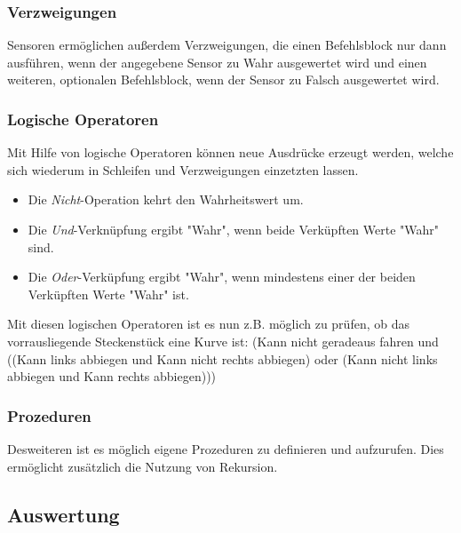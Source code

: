 \subsubsection{Verzweigungen}
\label{sec:implementation:program:elements:if-else}

Sensoren ermöglichen außerdem Verzweigungen, die einen Befehlsblock nur dann ausführen, wenn der angegebene Sensor zu Wahr ausgewertet wird und einen weiteren, optionalen Befehlsblock, wenn der Sensor zu Falsch ausgewertet wird. 

\subsubsection{Logische Operatoren}
\label{sec:implementation:program:elements:op}

Mit Hilfe von logische Operatoren können neue Ausdrücke erzeugt werden, welche sich wiederum in Schleifen und Verzweigungen einzetzten lassen.

\begin{itemize}
  \item Die \emph{Nicht}-Operation kehrt den Wahrheitswert um.
  \item Die \emph{Und}-Verknüpfung ergibt "Wahr", wenn beide Verküpften Werte "Wahr" sind.
  \item Die \emph{Oder}-Verküpfung ergibt "Wahr", wenn mindestens einer der beiden Verküpften Werte "Wahr" ist.
\end{itemize}

Mit diesen logischen Operatoren ist es nun z.B. möglich zu prüfen, ob das vorrausliegende Steckenstück eine Kurve ist: (Kann nicht geradeaus fahren und ((Kann links abbiegen und Kann nicht rechts abbiegen) oder (Kann nicht links abbiegen und Kann rechts abbiegen)))

\subsubsection{Prozeduren}
\label{sec:implementation:program:elements:proc}

Desweiteren ist es möglich eigene Prozeduren zu definieren und aufzurufen.  Dies ermöglicht zusätzlich die Nutzung von Rekursion.

\subsection{Auswertung}
\label{sec:implementation:program:evaluation}

